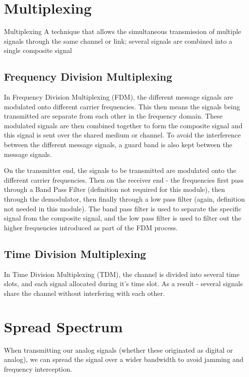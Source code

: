 \section{Multiplexing}
\begin{define}
\item[Multiplexing] A technique that allows the simultaneous transmission of multiple signals through the same channel or link; several signals are combined into a single composite signal
\end{define}

\subsection{Frequency Division Multiplexing}
In Frequency Division Multiplexing (FDM), the different message signals are modulated onto different carrier frequencies. This then means the signals being transmitted are separate from each other in the frequency domain. These modulated signals are then combined together to form the composite signal and this signal is sent over the shared medium or channel. To avoid the interference between the different message signals, a guard band is also kept between the message signals.

On the transmitter end, the signals to be transmitted are modulated onto the different carrier frequencies. Then on the receiver end - the frequencies first pass through a Band Pass Filter (definition not required for this module), then through the demodulator, then finally through a low pass filter (again, definition not needed in this module). The band pass filter is used to separate the specific signal from the composite signal, and the low pass filter is used to filter out the higher frequencies introduced as part of the FDM process.

\subsection{Time Division Multiplexing}
In Time Division Multiplexing (TDM), the channel is divided into several time slots, and each signal allocated during it's time slot. As a result - several signals share the channel without interfering with each other. 

\section{Spread Spectrum}
When transmitting our analog signals (whether these originated as digital or analog), we can spread the signal over a wider bandwidth to avoid jamming and frequency interception. 


